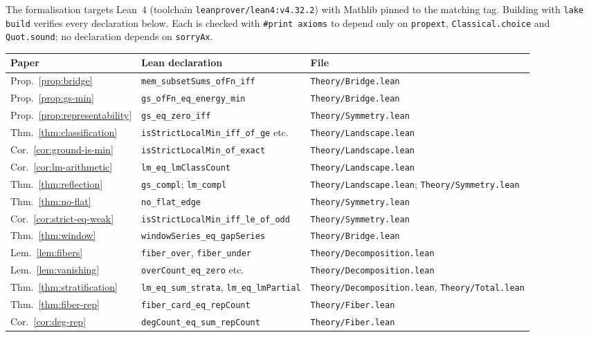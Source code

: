 \documentclass[11pt,a4paper]{article}
\theoremstyle{plain}
\theoremstyle{definition}
\theoremstyle{remark}
\newcommand{\Lean}[1]{\texttt{#1}}
\begin{document}
The formalisation targets Lean~4 (toolchain \Lean{leanprover/lean4:v4.32.2})
with Mathlib pinned to the matching tag. Building with \Lean{lake build}
verifies every declaration below. Each is checked with \Lean{\#print axioms} to
depend only on \Lean{propext}, \Lean{Classical.choice} and \Lean{Quot.sound};
no declaration depends on \Lean{sorryAx}.

\begin{center}
\small
\begin{tabular}{lll}
\toprule
Paper & Lean declaration & File\\
\midrule
Prop.~\ref{prop:bridge} & \Lean{mem\_subsetSums\_ofFn\_iff} & \Lean{Theory/Bridge.lean}\\
Prop.~\ref{prop:gs-min} & \Lean{gs\_ofFn\_eq\_energy\_min} & \Lean{Theory/Bridge.lean}\\
Prop.~\ref{prop:representability} & \Lean{gs\_eq\_zero\_iff} & \Lean{Theory/Symmetry.lean}\\
Thm.~\ref{thm:classification} & \Lean{isStrictLocalMin\_iff\_of\_ge} etc. & \Lean{Theory/Landscape.lean}\\
Cor.~\ref{cor:ground-is-min} & \Lean{isStrictLocalMin\_of\_exact} & \Lean{Theory/Landscape.lean}\\
Cor.~\ref{cor:lm-arithmetic} & \Lean{lm\_eq\_lmClassCount} & \Lean{Theory/Landscape.lean}\\
Thm.~\ref{thm:reflection} & \Lean{gs\_compl}; \Lean{lm\_compl} & \Lean{Theory/Landscape.lean}; \Lean{Theory/Symmetry.lean}\\
Thm.~\ref{thm:no-flat} & \Lean{no\_flat\_edge} & \Lean{Theory/Symmetry.lean}\\
Cor.~\ref{cor:strict-eq-weak} & \Lean{isStrictLocalMin\_iff\_le\_of\_odd} & \Lean{Theory/Symmetry.lean}\\
Thm.~\ref{thm:window} & \Lean{windowSeries\_eq\_gapSeries} & \Lean{Theory/Bridge.lean}\\
Lem.~\ref{lem:fibers} & \Lean{fiber\_over}, \Lean{fiber\_under} & \Lean{Theory/Decomposition.lean}\\
Lem.~\ref{lem:vanishing} & \Lean{overCount\_eq\_zero} etc. & \Lean{Theory/Decomposition.lean}\\
Thm.~\ref{thm:stratification} & \Lean{lm\_eq\_sum\_strata}, \Lean{lm\_eq\_lmPartial} & \Lean{Theory/Decomposition.lean}, \Lean{Theory/Total.lean}\\
Thm.~\ref{thm:fiber-rep} & \Lean{fiber\_card\_eq\_repCount} & \Lean{Theory/Fiber.lean}\\
Cor.~\ref{cor:deg-rep} & \Lean{degCount\_eq\_sum\_repCount} & \Lean{Theory/Fiber.lean}\\

\end{tabular}
\end{center}
\end{document}
